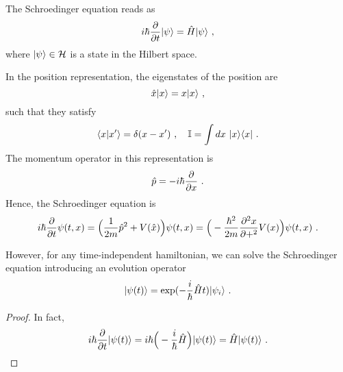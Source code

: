     The Schroedinger equation reads as 
    \begin{equation*}
        i \hbar \frac{\partial}{\partial t} \vert\psi\rangle = \hat H \vert\psi\rangle ~,
    \end{equation*}
    where $\vert\psi\rangle \in \mathcal H$ is a state in the Hilbert space.

    In the position representation, the eigenstates of the position are 
    \begin{equation*}
        \hat x \vert x\rangle = x \vert x\rangle ~,
    \end{equation*}
    such that they satisfy 
    \begin{equation*}
        \langle x\vert x'\rangle = \delta (x - x') ~, \quad \mathbb I = \int dx ~ \vert x\rangle \langle x\vert ~.
    \end{equation*}
    The momentum operator in this representation is 
    \begin{equation*}
        \hat p = - i \hbar \frac{\partial}{\partial x} ~.
    \end{equation*}
    Hence, the Schroedinger equation is 
    \begin{equation*}
        i \hbar \frac{\partial}{\partial t} \psi(t,x) = \Big (\frac{1}{2m} \hat p^2 + V(\hat x) \Big ) \psi(t,x) = \Big (-\frac{\hbar^2}{2m} \frac{\partial^2 x}{\partial+^2} V(x) \Big) \psi(t,x) ~.
    \end{equation*}

    However, for any time-independent hamiltonian, we can solve the Schroedinger equation introducing an evolution operator 
    \begin{equation*}
        \vert\psi(t)\rangle = \exp(- \frac{i}{\hbar} \hat H t) \vert\psi_i\rangle ~.
    \end{equation*}
    \begin{proof}
        In fact, 
        \begin{equation*}
            i \hbar \frac{\partial}{\partial t} \vert\psi(t)\rangle = i \hbar \Big ( - \frac{i}{\hbar} \hat H \Big) \vert\psi(t)\rangle = \hat H \vert\psi(t)\rangle ~. 
        \end{equation*}
    \end{proof}

